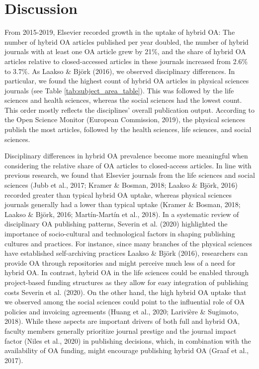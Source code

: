 \documentclass[a4paper,man,floatsintext,longtable,noextraspace,12pt]{apa6}
\begin{document}
\hypertarget{discussion}{%
\section{Discussion}\label{discussion}}

From 2015-2019, Elsevier recorded growth in the uptake of hybrid OA: The
number of hybrid OA articles published per year doubled, the number of
hybrid journals with at least one OA article grew by 21\%, and the share
of hybrid OA articles relative to closed-accessed articles in these
journals increased from 2.6\% to 3.7\%. As Laakso \& Björk (2016), we
observed disciplinary differences. In particular, we found the highest
count of hybrid OA articles in physical sciences journals (see Table
\ref{tab:subject_area_table}). This was followed by the life sciences
and health sciences, whereas the social sciences had the lowest count.
This order mostly reflects the disciplines' overall publication output.
According to the Open Science Monitor (European Commission, 2019), the
physical sciences publish the most articles, followed by the health
sciences, life sciences, and social sciences.

Disciplinary differences in hybrid OA prevalence become more meaningful
when considering the relative share of OA articles to closed-access
articles. In line with previous research, we found that Elsevier
journals from the life sciences and social sciences (Jubb et al., 2017;
Kramer \& Bosman, 2018; Laakso \& Björk, 2016) recorded greater than
typical hybrid OA uptake, whereas physical sciences journals generally
had a lower than typical uptake (Kramer \& Bosman, 2018; Laakso \&
Björk, 2016; Martín-Martín et al., 2018). In a systematic review of
disciplinary OA publishing patterns, Severin et al. (2020) highlighted
the importance of socio-cultural and technological factors in shaping
publishing cultures and practices. For instance, since many branches of
the physical sciences have established self-archiving practices Laakso
\& Björk (2016), researchers can provide OA through repositories and
might perceive much less of a need for hybrid OA. In contrast, hybrid OA
in the life sciences could be enabled through project-based funding
structures as they allow for easy integration of publishing costs
Severin et al. (2020). On the other hand, the high hybrid OA uptake that
we observed among the social sciences could point to the influential
role of OA policies and invoicing agreements (Huang et al., 2020;
Larivière \& Sugimoto, 2018). While these aspects are important drivers
of both full and hybrid OA, faculty members generally prioritize journal
prestige and the journal impact factor (Niles et al., 2020) in
publishing decisions, which, in combination with the availability of OA
funding, might encourage publishing hybrid OA (Graaf et al., 2017).
\end{document}

